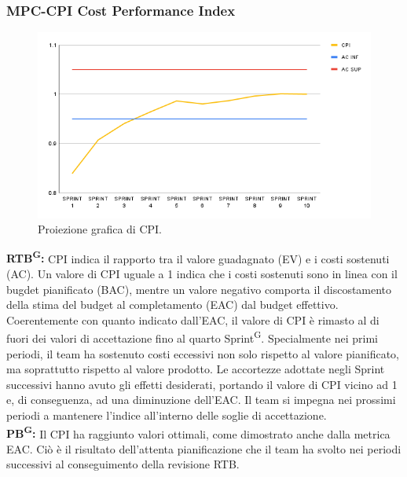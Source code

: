 \documentclass[8pt]{article}
\newcommand{\glossterm}[1]{#1\textsuperscript{G}} %
\begin{document}
\subsubsection{MPC-CPI Cost Performance Index}
\begin{figure}[h!]
    \centering
    \includegraphics[width=1\textwidth]{images_pdq/CPI.png}
    \caption{Proiezione grafica di CPI.}
    \label{fig:Proiezione grafica di CPI}
\end{figure}
\textbf{\glossterm{RTB}:} CPI indica il rapporto tra il valore guadagnato (EV) e i costi sostenuti (AC). Un valore di CPI uguale a 1 indica che i costi sostenuti sono in linea con il bugdet pianificato (BAC), mentre un valore negativo comporta il discostamento della stima del budget al completamento (EAC) dal budget effettivo.\\
Coerentemente con quanto indicato dall'EAC, il valore di CPI è rimasto al di fuori dei valori di accettazione fino al quarto \glossterm{Sprint}. Specialmente nei primi periodi, il team ha sostenuto costi eccessivi non solo rispetto al valore pianificato, ma soprattutto rispetto al valore prodotto. Le accortezze adottate negli Sprint successivi hanno avuto gli effetti desiderati, portando il valore di CPI vicino ad 1 e, di conseguenza, ad una diminuzione dell'EAC. Il team si impegna nei prossimi periodi a mantenere l'indice all'interno delle soglie di accettazione. \\
\textbf{\glossterm{PB}:} Il CPI ha raggiunto valori ottimali, come dimostrato anche dalla metrica EAC. Ciò è il risultato dell'attenta pianificazione che il team ha svolto nei periodi successivi al conseguimento della revisione RTB.
\clearpage
\end{document}
